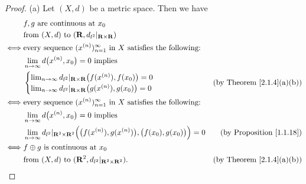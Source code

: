 \begin{proof}{(a)}
    Let \((X, d)\) be a metric space.
    Then we have
    \begin{align*}
             & f, g \text{ are continuous at } x_0                                                                                                                                             \\
             & \text{from } (X, d) \text{ to } (\mathbf{R}, d_{l^2}|_{\mathbf{R} \times \mathbf{R}})                                                                                           \\
        \iff & \text{every sequence } (x^{(n)})_{n = 1}^\infty \text{ in } X \text{ satisfies the following:}                                                                                  \\
             & \lim_{n \to \infty} d\big(x^{(n)}, x_0\big) = 0 \text{ implies }                                                                                                                \\
             & \begin{cases}
                   \lim_{n \to \infty} d_{l^2}|_{\mathbf{R} \times \mathbf{R}}\big(f(x^{(n)}), f(x_0)\big) = 0 \\
                   \lim_{n \to \infty} d_{l^2}|_{\mathbf{R} \times \mathbf{R}}\big(g(x^{(n)}), g(x_0)\big) = 0
               \end{cases}                                          & \text{(by Theorem \ref{2.1.4}(a)(b))}                                                                                    \\
        \iff & \text{every sequence } (x^{(n)})_{n = 1}^\infty \text{ in } X \text{ satisfies the following:}                                                                                  \\
             & \lim_{n \to \infty} d\big(x^{(n)}, x_0\big) = 0 \text{ implies }                                                                                                                \\
             & \lim_{n \to \infty} d_{l^2}|_{\mathbf{R}^2 \times \mathbf{R}^2}\Big(\big(f(x^{(n)}), g(x^{(n)})\big), \big(f(x_0), g(x_0)\big)\Big) = 0 & \text{(by Proposition \ref{1.1.18})}  \\
        \iff & f \oplus g \text{ is continuous at } x_0                                                                                                                                        \\
             & \text{from } (X, d) \text{ to } (\mathbf{R}^2, d_{l^2}|_{\mathbf{R}^2 \times \mathbf{R}^2}).                                            & \text{(by Theorem \ref{2.1.4}(a)(b))}
    \end{align*}
\end{proof}


